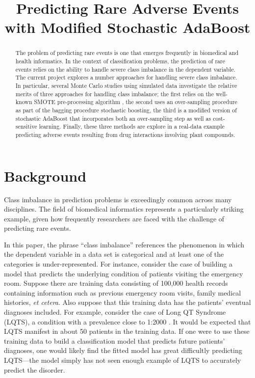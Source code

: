 \documentclass[10pt]{article}
\title{\fontsize{14}{14} Predicting Rare Adverse Events with Modified Stochastic AdaBoost}
\author{}
\date{}
\begin{document}
\maketitle

\begin{abstract}
The problem of predicting rare events is one that emerges frequently in biomedical and health informatics. In the context of classification problems, the prediction of rare events relies on the ability to handle severe class imbalance in the dependent variable. The current project explores a number approaches for handling severe class imbalance. In particular, several Monte Carlo studies using simulated data investigate the relative merits of three approaches for handling class imbalance; the first relies on the well-known SMOTE pre-processing algorithm \cite{chawla02}, the second uses an over-sampling procedure as part of the bagging procedure stochastic boosting, the third is a modified version of stochastic AdaBoost that incorporates both an over-sampling step as well as cost-sensitive learning. Finally, these three methods are explore in a real-data example predicting adverse events resulting from drug interactions involving plant compounds. 
\end{abstract}

\section{Background}

Class imbalance in prediction problems is exceedingly common across many disciplines. The field of biomedical informatics represents a particularly striking example, given how frequently researchers are faced with the challenge of predicting rare events. 

In this paper, the phrase ``class imbalance'' references the phenomenon in which the dependent variable in a data set is categorical and at least one of the categories is under-represented. For instance, consider the case of building a model that predicts the underlying condition of patients visiting the emergency room. Suppose there are training data consisting of 100,000 health records containing information such as previous emergency room visits, family medical histories, \textit{et cetera}. Also suppose that this training data has the patients' eventual diagnoses included. For example, consider the case of Long QT Syndrome (LQTS), a condition with a prevalence close to 1:2000 \cite{schwartz09}. It would be expected that LQTS manifest in about 50 patients in the training data. If one were to use these training data to build a classification model that predicts future patients' diagnoses, one would likely find the fitted model has great difficultly predicting LQTS---the model simply has not seen enough example of LQTS to accurately predict the disorder. 
\end{document}

